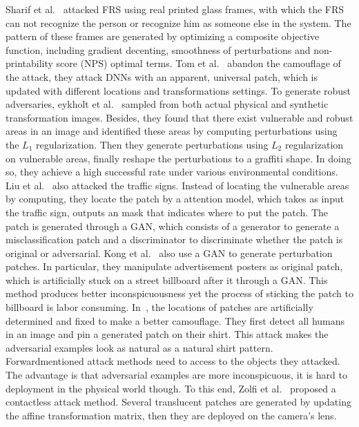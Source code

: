 \documentclass[10pt,twocolumn,letterpaper]{article}
\begin{document}
Sharif et al.~\cite{Sharif_2017_CCS} attacked FRS using real 
printed glass frames, 
with which the FRS can not recognize the person or recognize him
as someone else in the system. The pattern of these frames are 
generated by optimizing a composite objective function, 
including gradient decenting, smoothness of perturbations and 
non-printability score (NPS) optimal terms.
Tom et al.~\cite{Brown_2017_arxiv} abandon the camouflage of the attack, 
they attack DNNs with an apparent, universal patch, 
which is updated with different locations and transformations settings.
To generate robust adversaries, 
eykholt et al.~\cite{Eykholt_2018_CVPR} sampled from both 
actual physical and synthetic transformation images. Besides,
they found that there exist vulnerable and robust areas in an 
image and identified these areas by computing perturbations 
using the $L_1$ regularization. Then they generate perturbations 
using $L_2$ regularization on vulnerable areas, finally reshape 
the perturbations to a graffiti shape. In doing so, they achieve 
a high successful rate under various environmental conditions.
Liu et al.~\cite{Liu_2019_AAAI} also attacked the traffic signs. Instead of 
locating the vulnerable areas by computing, they locate 
the patch by a attention model, which takes as input the 
traffic sign, outputs an mask that indicates where to put the patch. 
The patch is generated through a GAN, which consists of a generator 
to generate a misclassification patch and a discriminator 
to discriminate whether the patch is original or adversarial. 
Kong et al.~\cite{Kong_2020_CVPR} also use a GAN to generate 
perturbation patches. 
In particular, they manipulate advertisement posters as original patch, 
which is artificially stuck on a street billboard after it 
through a GAN. This method produces better inconspicuousness yet 
the process of sticking the patch to billboard is labor consuming.
In~\cite{Hu_2021_ICCV}, the locations of patches are artificially 
determined and fixed
to make a better camouflage.
They first detect all humans in an image and pin a generated patch 
on their shirt. This attack makes the adversarial examples look as 
natural as a natural shirt pattern.
Forwardmentioned attack methods need to access to the objects they 
attacked. The advantage is that adversarial examples are more 
inconspicuous, it is hard to deployment in the physical world though. 
To this end, Zolfi et al.~\cite{Zolfi_2021_CVPR} proposed 
a contactless attack method. 
Several translucent patches are generated by updating the affine 
transformation matrix, then they are deployed on the camera's lens.
\end{document}
